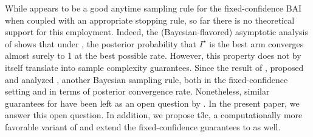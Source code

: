 While \TTTS appears to be a good anytime sampling rule for the fixed-confidence BAI when coupled with an appropriate stopping rule, so far there is no theoretical support for this employment. Indeed, the (Bayesian-flavored) asymptotic analysis of \cite{russo2016ttts} shows that under \TTTS, the posterior probability that $I^\star$ is the best arm converges almost surely to 1 at the best possible rate. However, this property does not by itself translate into sample complexity guarantees. Since the result of \cite{russo2016ttts}, \citet{qin2017ttei} proposed and analyzed \TTEI, another Bayesian sampling rule, both in the fixed-confidence setting and in terms of posterior convergence rate. Nonetheless, similar guarantees for \TTTS have been left as an open question by \cite{russo2016ttts}. In the present paper, we answer this open question. In addition, we propose \gls{t3c}, a computationally more favorable variant of \TTTS and  extend the fixed-confidence guarantees to \TCC as well.



 
